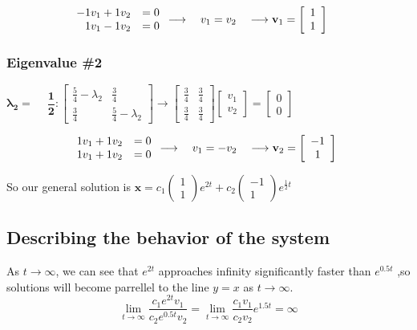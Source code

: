 \documentclass[12pt]{article}
\begin{document}
\begin{enumerate}
    $\hspace*{2cm}\begin{array}{rr} -1v_1 + 1v_2 &=0 \\ 1v_1 - 1v_2 &=0 \end{array} 
     \longrightarrow \quad v_1=v_2 \quad \longrightarrow \mathbf{v}_1 =\left[\begin{array}{cc} 1 \\ 1 \end{array}\right]$

    \subsubsection*{Eigenvalue \#2}
    $\mathbf{\lambda_2 = \phantom{-}\dfrac{1}{2}}: 
    \left[\begin{array}{cc} \frac{5}{4} - \lambda_2 & \frac{3}{4}\\ \frac{3}{4} & \frac{5}{4} - \lambda_2\end{array}\right]
    \rightarrow \left[\begin{array}{rr} \frac{3}{4}& \frac{3}{4}\\ \frac{3}{4} & \frac{3}{4} \end{array}\right] \left[\begin{array}{cc} v_1 \\ v_2 \end{array}\right] = \left[\begin{array}{cc} 0 \\ 0 \end{array}\right]$

    $\hspace*{2cm}\begin{array}{rr} 1v_1 + 1v_2 &=0 \\ 1v_1 + 1v_2 &=0 \end{array} 
    \longrightarrow \quad v_1=-v_2 \quad \longrightarrow \mathbf{v}_2 =\left[\begin{array}{cc} -1 \\ 1 \end{array}\right]$

    So our general solution is $\mathbf{x} = c_1\begin{pmatrix} 1 \\ 1 \end{pmatrix}e^{2t} + c_2\begin{pmatrix} -1 \\ 1 \end{pmatrix}e^{\frac{1}{2}t}$
    \subsection*{Describing the behavior of the system}
    As $t \to \infty$, we can see that $e^{2t}$ approaches infinity significantly faster than $e^{0.5t}$
    ,so solutions will become parrellel to the line $y=x$ as $t \to \infty$.
    $$\lim_{t \to \infty} \frac{c_1e^{2t}v_1}{c_2e^{0.5t}v_2}  = \lim_{t \to \infty} \frac{c_1v_1}{c_2v_2}e^{1.5t} = \infty$$

\end{enumerate}
\end{document}
